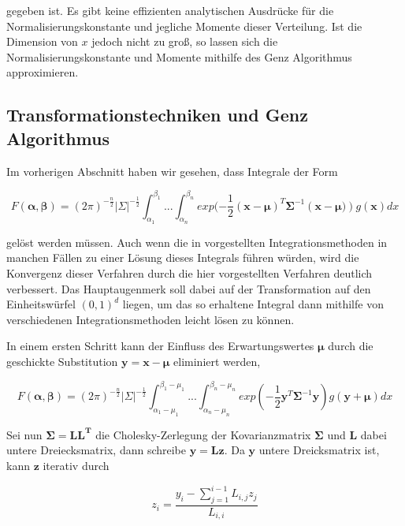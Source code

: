 \documentclass[12pt,a4paper]{scrartcl}
\numberwithin{equation}{section}
\begin{document}
gegeben ist.
Es gibt keine effizienten analytischen Ausdrücke für die Normalisierungskonstante und jegliche Momente dieser Verteilung. Ist die Dimension von $x$ jedoch nicht zu groß, so lassen sich die 
Normalisierungskonstante und Momente mithilfe des Genz Algorithmus approximieren. 

\subsection{Transformationstechniken und Genz Algorithmus}
Im vorherigen Abschnitt haben wir gesehen, dass Integrale der Form

\begin{equation}
 F(\mathbf{\alpha},\mathbf{\beta}) = (2\pi)^{-\frac{n}{2}} |\Sigma|^{-\frac{1}{2}} \int_{\alpha_1}^{\beta_1} ... \int_{\alpha_n}^{\beta_n} exp(-\frac{1}{2}(\mathbf{x}-\mathbf{\mu})^T \mathbf{\Sigma}^{-1}(\mathbf{x}-\mathbf{\mu)}) g(\mathbf{x}) dx
\end{equation}

gelöst werden müssen. 
Auch wenn die in vorgestellten Integrationsmethoden in manchen Fällen zu einer Lösung dieses Integrals führen würden, wird die Konvergenz dieser Verfahren durch die hier vorgestellten
Verfahren deutlich verbessert. Das Hauptaugenmerk soll dabei auf der Transformation auf den Einheitswürfel $(0,1)^d$ liegen, um das so erhaltene Integral dann mithilfe von verschiedenen
Integrationsmethoden leicht lösen zu können. 

In einem ersten Schritt kann der Einfluss des Erwartungswertes $\mathbf{\mu}$ durch die geschickte Substitution $\mathbf{y} = \mathbf{x} - \mathbf{\mu}$ eliminiert werden,

\begin{equation}
  F(\mathbf{\alpha},\mathbf{\beta}) = (2\pi)^{-\frac{n}{2}} |\Sigma|^{-\frac{1}{2}} \int_{\alpha_1 -\mu_1}^{\beta_1-\mu_1} ... \int_{\alpha_n - \mu_n}^{\beta_n - \mu_n} exp(-\frac{1}{2} \mathbf{y}^T \mathbf{\Sigma}^{-1}\mathbf{y}) g(\mathbf{y} + \mathbf{\mu}) dx
\end{equation}

Sei nun $\mathbf{\Sigma = L L^T}$ die Cholesky-Zerlegung der Kovarianzmatrix $\mathbf{\Sigma}$ und $\mathbf{L}$ dabei untere Dreiecksmatrix, dann schreibe $\mathbf{y = Lz}$. Da 
$\mathbf{y}$ untere Dreicksmatrix ist, kann $\mathbf{z}$ iterativ durch 

\begin{equation}
 z_i = \frac{y_i - \sum_{j=1}^{i-1} L_{i,j}z_j}{L_{i,i}}
\end{equation}
\end{document}
